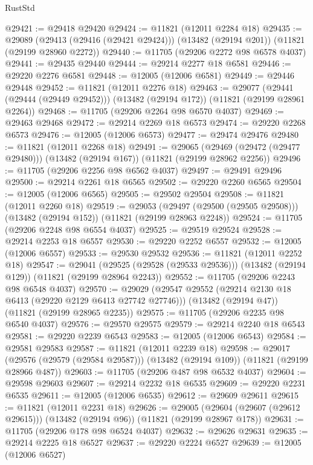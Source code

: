 \begin{lexlean}{RustStd}
\begin{coremodule}
@29421 := @29418 @29420
@29424 := @11821 (@12011 @2284 @18)
@29435 := @29089
    (@29413 (@29416 (@29421 @29424)))
    (@13482 (@29194 @201))
    (@11821 (@29199 @28960 @2272))
@29440 := @11705 (@29206 @2272 @98 @6578 @4037)
@29441 := @29435 @29440
@29444 := @29214 @2277 @18 @6581
@29446 := @29220 @2276 @6581
@29448 := @12005 (@12006 @6581)
@29449 := @29446 @29448
@29452 := @11821 (@12011 @2276 @18)
@29463 := @29077
    (@29441 (@29444 (@29449 @29452)))
    (@13482 (@29194 @172))
    (@11821 (@29199 @28961 @2264))
@29468 := @11705 (@29206 @2264 @98 @6570 @4037)
@29469 := @29463 @29468
@29472 := @29214 @2269 @18 @6573
@29474 := @29220 @2268 @6573
@29476 := @12005 (@12006 @6573)
@29477 := @29474 @29476
@29480 := @11821 (@12011 @2268 @18)
@29491 := @29065
    (@29469 (@29472 (@29477 @29480)))
    (@13482 (@29194 @167))
    (@11821 (@29199 @28962 @2256))
@29496 := @11705 (@29206 @2256 @98 @6562 @4037)
@29497 := @29491 @29496
@29500 := @29214 @2261 @18 @6565
@29502 := @29220 @2260 @6565
@29504 := @12005 (@12006 @6565)
@29505 := @29502 @29504
@29508 := @11821 (@12011 @2260 @18)
@29519 := @29053
    (@29497 (@29500 (@29505 @29508)))
    (@13482 (@29194 @152))
    (@11821 (@29199 @28963 @2248))
@29524 := @11705 (@29206 @2248 @98 @6554 @4037)
@29525 := @29519 @29524
@29528 := @29214 @2253 @18 @6557
@29530 := @29220 @2252 @6557
@29532 := @12005 (@12006 @6557)
@29533 := @29530 @29532
@29536 := @11821 (@12011 @2252 @18)
@29547 := @29041
    (@29525 (@29528 (@29533 @29536)))
    (@13482 (@29194 @129))
    (@11821 (@29199 @28964 @2243))
@29552 := @11705 (@29206 @2243 @98 @6548 @4037)
@29570 := @29029
    (@29547 @29552 (@29214 @2130 @18 @6413 (@29220 @2129 @6413 @27742 @27746)))
    (@13482 (@29194 @47))
    (@11821 (@29199 @28965 @2235))
@29575 := @11705 (@29206 @2235 @98 @6540 @4037)
@29576 := @29570 @29575
@29579 := @29214 @2240 @18 @6543
@29581 := @29220 @2239 @6543
@29583 := @12005 (@12006 @6543)
@29584 := @29581 @29583
@29587 := @11821 (@12011 @2239 @18)
@29598 := @29017
    (@29576 (@29579 (@29584 @29587)))
    (@13482 (@29194 @109))
    (@11821 (@29199 @28966 @487))
@29603 := @11705 (@29206 @487 @98 @6532 @4037)
@29604 := @29598 @29603
@29607 := @29214 @2232 @18 @6535
@29609 := @29220 @2231 @6535
@29611 := @12005 (@12006 @6535)
@29612 := @29609 @29611
@29615 := @11821 (@12011 @2231 @18)
@29626 := @29005
    (@29604 (@29607 (@29612 @29615)))
    (@13482 (@29194 @96))
    (@11821 (@29199 @28967 @178))
@29631 := @11705 (@29206 @178 @98 @6524 @4037)
@29632 := @29626 @29631
@29635 := @29214 @2225 @18 @6527
@29637 := @29220 @2224 @6527
@29639 := @12005 (@12006 @6527)

\end{coremodule}
\end{lexlean}
